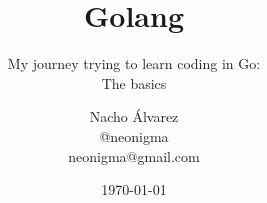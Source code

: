 \documentclass{beamer}
\begin{document}
\title{Golang}
\subtitle{My journey trying to learn coding in Go:\\The basics}
\author[Nacho Álvarez]{\texorpdfstring{Nacho Álvarez
  \\ \faTwitter \hspace{5pt}@neonigma
  \\ \faEnvelope \hspace{5pt}neonigma@gmail.com}{Author}}

\date{\today}




\section[Índice]{}
\frame{\tableofcontents}









\end{document}
